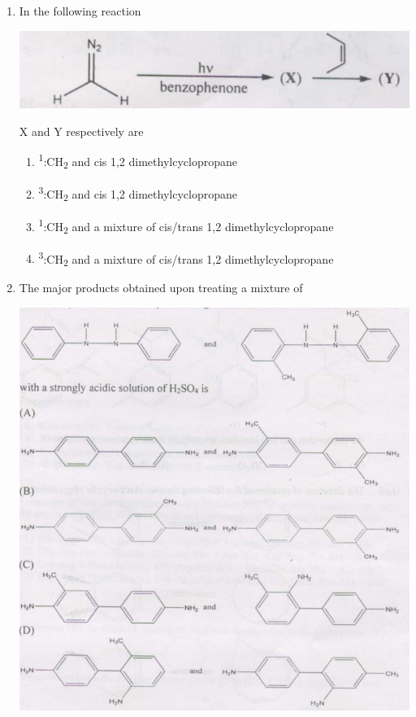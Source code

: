 \documentclass[journal,12pt,onecolumn]{IEEEtran}
\theoremstyle{remark}
\begin{document}
\begin{enumerate}
  

\item  In the following reaction \hfill{}

\includegraphics[scale=1.5 ]{figs/image6.png}

X and Y respectively are

\begin{multicols}{2}
\begin{enumerate}
     \item   \textsuperscript{1}:CH\textsubscript{2} and cis 1,2 dimethylcyclopropane
     \item   \textsuperscript{3}:CH\textsubscript{2} and cis 1,2 dimethylcyclopropane
     \item   \textsuperscript{1}:CH\textsubscript{2} and a mixture of cis/trans 1,2 dimethylcyclopropane
     \item   \textsuperscript{3}:CH\textsubscript{2} and a mixture of cis/trans 1,2 dimethylcyclopropane
\end{enumerate}
\end{multicols}

\item  The major products obtained upon treating a mixture of \hfill{}

\includegraphics[scale=1]{figs/image7.png} 
   


\end{enumerate}
\end{document}
